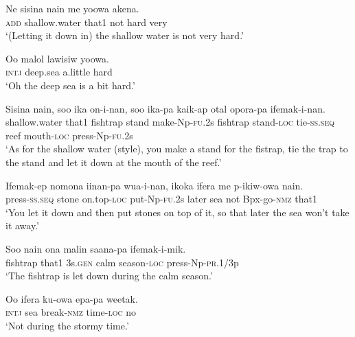 {\ea\label{ex:a:x6}
\gll  Ne  sisina  nain  me  yoowa  akena. \\
\textsc{add}  shallow.water  that1  not  hard  very \\
\glt ‘(Letting it down in) the shallow water is not very hard.’ \\
\z


\ea\label{ex:a:x7}
\gll  Oo  malol  lawisiw  yoowa. \\
\textsc{intj}  deep.sea  a.little  hard \\
\glt ‘Oh the deep sea is a bit hard.’ \\
\z


\ea\label{ex:a:x8}
\gll  Sisina  nain,  soo  ika  on-i-nan,              soo  ika-pa  kaik-ap  otal  opora-pa              ifemak-i-nan. \\
shallow.water  that1  fishtrap  stand  make-Np-\textsc{fu}.2s  fishtrap  stand-\textsc{loc}  tie-\textsc{ss.seq}  reef  mouth-\textsc{loc}  press-Np-\textsc{fu}.2s \\




\glt ‘As for the shallow water (style), you make a stand for the fistrap, tie the trap to the stand and let it down at the mouth of the reef.’ \\
\z


\ea\label{ex:a:x9}
\gll  Ifemak-ep  nomona  iinan-pa  wua-i-nan,  ikoka  ifera  me  p-ikiw-owa  nain. \\
press-\textsc{ss.seq}  stone  on.top-\textsc{loc}  put-Np-\textsc{fu}.2s  later  sea    not  Bpx-go-\textsc{nmz}  that1 \\


\glt ‘You let it down and then put stones on top of it, so that later the sea won’t take it away.’ \\
\z


\ea\label{ex:a:x10}
\gll  Soo  nain  ona  malin  saana-pa  ifemak-i-mik. \\
fishtrap  that1  3s.\textsc{gen}  calm  season-\textsc{loc}  press-Np-\textsc{pr}.1/3p \\
\glt ‘The fishtrap is let down during the calm season.’ \\
\z


\ea\label{ex:a:x11}
\gll  Oo  ifera  ku-owa  epa-pa  weetak. \\
\textsc{intj}  sea  break-\textsc{nmz}  time-\textsc{loc}  no \\
\glt ‘Not during the stormy time.’ \\
\z


}
